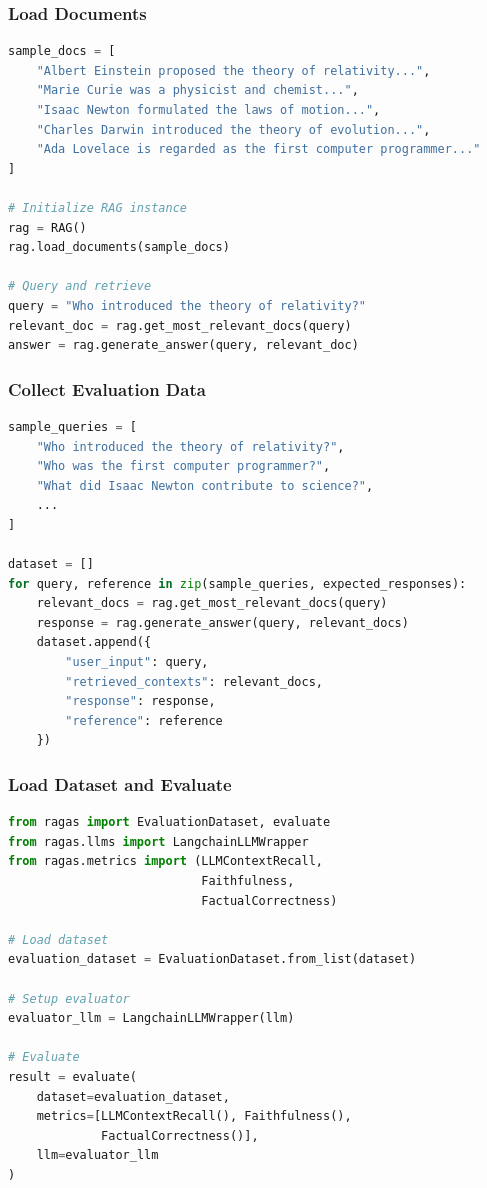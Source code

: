 \begin{frame}[fragile]\frametitle{Load Documents}

\begin{lstlisting}[language=Python,basicstyle=\tiny]
sample_docs = [
    "Albert Einstein proposed the theory of relativity...",
    "Marie Curie was a physicist and chemist...",
    "Isaac Newton formulated the laws of motion...",
    "Charles Darwin introduced the theory of evolution...",
    "Ada Lovelace is regarded as the first computer programmer..."
]

# Initialize RAG instance
rag = RAG()
rag.load_documents(sample_docs)

# Query and retrieve
query = "Who introduced the theory of relativity?"
relevant_doc = rag.get_most_relevant_docs(query)
answer = rag.generate_answer(query, relevant_doc)
\end{lstlisting}
\end{frame}

\begin{frame}[fragile]\frametitle{Collect Evaluation Data}

\begin{lstlisting}[language=Python,basicstyle=\tiny]
sample_queries = [
    "Who introduced the theory of relativity?",
    "Who was the first computer programmer?",
    "What did Isaac Newton contribute to science?",
    ...
]

dataset = []
for query, reference in zip(sample_queries, expected_responses):
    relevant_docs = rag.get_most_relevant_docs(query)
    response = rag.generate_answer(query, relevant_docs)
    dataset.append({
        "user_input": query,
        "retrieved_contexts": relevant_docs,
        "response": response,
        "reference": reference
    })
\end{lstlisting}
\end{frame}

\begin{frame}[fragile]\frametitle{Load Dataset and Evaluate}

\begin{lstlisting}[language=Python]
from ragas import EvaluationDataset, evaluate
from ragas.llms import LangchainLLMWrapper
from ragas.metrics import (LLMContextRecall, 
                           Faithfulness, 
                           FactualCorrectness)

# Load dataset
evaluation_dataset = EvaluationDataset.from_list(dataset)

# Setup evaluator
evaluator_llm = LangchainLLMWrapper(llm)

# Evaluate
result = evaluate(
    dataset=evaluation_dataset,
    metrics=[LLMContextRecall(), Faithfulness(), 
             FactualCorrectness()],
    llm=evaluator_llm
)
\end{lstlisting}
\end{frame}

